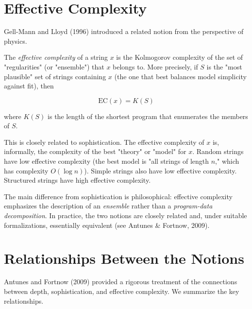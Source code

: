 \section{Effective Complexity}

Gell-Mann and Lloyd (1996) introduced a related notion from the perspective of physics.

\begin{definition}
The \textit{effective complexity} of a string $x$ is the Kolmogorov complexity of the set of "regularities" (or "ensemble") that $x$ belongs to. More precisely, if $S$ is the "most plausible" set of strings containing $x$ (the one that best balances model simplicity against fit), then

\[\text{EC}(x) = K(S)\]

where $K(S)$ is the length of the shortest program that enumerates the members of $S$.

This is closely related to sophistication. The effective complexity of $x$ is, informally, the complexity of the best "theory" or "model" for $x$. Random strings have low effective complexity (the best model is "all strings of length $n$," which has complexity $O(\log n)$). Simple strings also have low effective complexity. Structured strings have high effective complexity.

The main difference from sophistication is philosophical: effective complexity emphasizes the description of an \textit{ensemble} rather than a \textit{program-data decomposition}. In practice, the two notions are closely related and, under suitable formalizations, essentially equivalent (see Antunes \& Fortnow, 2009).
\end{definition}

\section{Relationships Between the Notions}

Antunes and Fortnow (2009) provided a rigorous treatment of the connections between depth, sophistication, and effective complexity. We summarize the key relationships.

